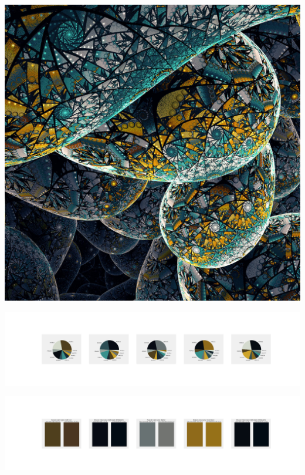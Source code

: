 \documentclass[11pt]{article}
\begin{document}
\begin{landscape}
    \begin{center}
    \includegraphics[width=\textwidth]{./nbimg/file (371).jpg}
    \end{center}

    \begin{center}
    \includegraphics[width=250mm]{./nbimg/pie-302.jpg}
    \end{center}

    \begin{center}
    \includegraphics[width=250mm]{./nbimg/peak-302.jpg}
    \end{center}
    


\end{landscape}
\end{document}
